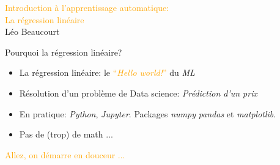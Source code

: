 \documentclass[11pt]{beamer}
\author{\textcolor{black}{Introduction à l'apprentissage automatique} \hfill \textcolor{orange}{Léo Beaucourt} \hfill \textcolor{black}{Agaetis}}
\begin{document}
\begin{frame}

  \vspace{5cm}
  \begin{center}
    \Large
    \textcolor{orange}{Introduction à l'apprentissage automatique:}\\
    \textcolor{orange}{La régression linéaire}\\
    \normalsize
    \vspace{0.5cm}
    Léo Beaucourt
  \end{center}
    
\end{frame}



\begin{frame}{Pourquoi la régression linéaire?}

  \begin{itemize}
  \item La régression linéaire: le \textcolor{orange}{``\textit{Hello world!}''} du \textit{ML}
    \vspace{0.2cm}
  \item Résolution d'un problème de Data science: \textit{Prédiction d'un prix}
    \vspace{0.2cm}
  \item En pratique: \textit{Python}, \textit{Jupyter}. Packages \textit{numpy} \textit{pandas} et \textit{matplotlib}.
    \vspace{0.2cm}
  \item Pas de (trop) de math ...
  \end{itemize}

  \vfill
  \begin{center}
    \large
    \textcolor{orange}{Allez, on démarre en douceur ...}
  \end{center}

\end{frame}
\end{document}
